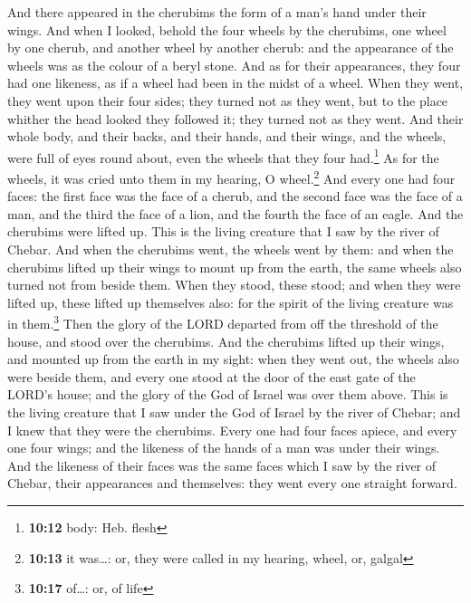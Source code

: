  And there appeared in the cherubims the form of a man's
hand under their wings.  And when I looked, behold the
four wheels by the cherubims, one wheel by one cherub, and another wheel
by another cherub: and the appearance of the wheels was as the colour of
a beryl stone.  And as for their appearances, they four
had one likeness, as if a wheel had been in the midst of a wheel.
 When they went, they went upon their four sides; they
turned not as they went, but to the place whither the head looked they
followed it; they turned not as they went.  And their
whole body, and their backs, and their hands, and their wings, and the
wheels, were full of eyes round about, even the wheels that they four
had.\footnote{\textbf{10:12} body: Heb. flesh}  As for
the wheels, it was cried unto them in my hearing, O wheel.\footnote{\textbf{10:13}
  it was\ldots: or, they were called in my hearing, wheel, or, galgal}
 And every one had four faces: the first face was the
face of a cherub, and the second face was the face of a man, and the
third the face of a lion, and the fourth the face of an eagle.
 And the cherubims were lifted up. This is the living
creature that I saw by the river of Chebar.  And when the
cherubims went, the wheels went by them: and when the cherubims lifted
up their wings to mount up from the earth, the same wheels also turned
not from beside them.  When they stood, these stood; and
when they were lifted up, these lifted up themselves also: for the
spirit of the living creature was in them.\footnote{\textbf{10:17}
  of\ldots: or, of life}  Then the glory of the LORD
departed from off the threshold of the house, and stood over the
cherubims.  And the cherubims lifted up their wings, and
mounted up from the earth in my sight: when they went out, the wheels
also were beside them, and every one stood at the door of the east gate
of the LORD's house; and the glory of the God of Israel was over them
above.  This is the living creature that I saw under the
God of Israel by the river of Chebar; and I knew that they were the
cherubims.  Every one had four faces apiece, and every
one four wings; and the likeness of the hands of a man was under their
wings.  And the likeness of their faces was the same
faces which I saw by the river of Chebar, their appearances and
themselves: they went every one straight forward.

